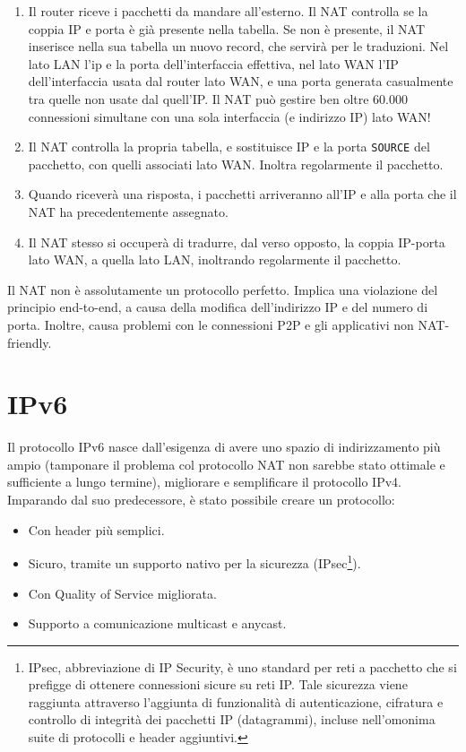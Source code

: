 \begin{enumerate}
	\item Il router riceve i pacchetti da mandare all'esterno. Il NAT controlla se la coppia IP e porta è già presente nella tabella. Se non è presente, il NAT inserisce nella sua tabella un nuovo record, che servirà per le traduzioni. Nel lato LAN l'ip e la porta dell'interfaccia effettiva, nel lato WAN l'IP dell'interfaccia usata dal router lato WAN, e una porta generata casualmente tra quelle non usate dal quell'IP. Il NAT può gestire ben oltre 60.000 connessioni simultane con una sola interfaccia (e indirizzo IP) lato WAN!
	
	\item Il NAT controlla la propria tabella, e sostituisce IP e la porta \verb|SOURCE| del pacchetto, con quelli associati lato WAN. Inoltra regolarmente il pacchetto.
	
	\item Quando riceverà una risposta, i pacchetti arriveranno all'IP e alla porta che il NAT ha precedentemente assegnato.
	
	\item Il NAT stesso si occuperà di tradurre, dal verso opposto, la coppia IP-porta lato WAN, a quella lato LAN, inoltrando regolarmente il pacchetto.
\end{enumerate}
Il NAT non è assolutamente un protocollo perfetto. Implica una violazione del principio end-to-end, a causa della modifica dell'indirizzo IP e del numero di porta. Inoltre, causa problemi con le connessioni P2P e gli applicativi non NAT-friendly.

\newpage

\section{IPv6}
Il protocollo IPv6 nasce dall'esigenza di avere uno spazio di indirizzamento più ampio (tamponare il problema col protocollo NAT non sarebbe stato ottimale e sufficiente a lungo termine), migliorare e semplificare il protocollo IPv4. Imparando dal suo predecessore, è stato possibile creare un protocollo:
\begin{itemize}
	\item Con header più semplici.
	\item Sicuro, tramite un supporto nativo per la sicurezza (IPsec\footnote{IPsec, abbreviazione di IP Security, è uno standard per reti a pacchetto che si prefigge di ottenere connessioni sicure su reti IP. Tale sicurezza viene raggiunta attraverso l'aggiunta di funzionalità di autenticazione, cifratura e controllo di integrità dei pacchetti IP (datagrammi), incluse nell'omonima suite di protocolli e header aggiuntivi.}).
	\item Con Quality of Service migliorata.
	\item Supporto a comunicazione multicast e anycast.
\end{itemize}

